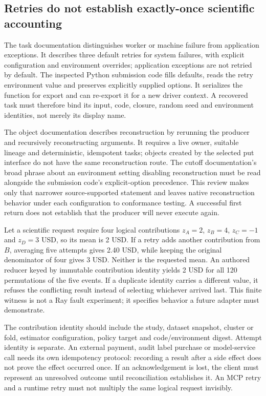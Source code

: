 \subsection{Retries do not establish exactly-once scientific accounting}
The task documentation distinguishes worker or machine failure from application exceptions. It describes three default retries for system failures, with explicit configuration and environment overrides; application exceptions are not retried by default. The inspected Python submission code fills defaults, reads the retry environment value and preserves explicitly supplied options. It serializes the function for export and can re-export it for a new driver context. A recovered task must therefore bind its input, code, closure, random seed and environment identities, not merely its display name.\citep{exec24_ray_sources}

The object documentation describes reconstruction by rerunning the producer and recursively reconstructing arguments. It requires a live owner, suitable lineage and deterministic, idempotent tasks; objects created by the selected put interface do not have the same reconstruction route. The cutoff documentation's broad phrase about an environment setting disabling reconstruction must be read alongside the submission code's explicit-option precedence. This review makes only that narrower source-supported statement and leaves native reconstruction behavior under each configuration to conformance testing. A successful first return does not establish that the producer will never execute again.\citep{exec24_ray_sources}

Let a scientific request require four logical contributions $z_A=2$, $z_B=4$, $z_C=-1$ and $z_D=3$ USD, so its mean is 2 USD. If a retry adds another contribution from $B$, averaging five attempts gives 2.40 USD, while keeping the original denominator of four gives 3 USD. Neither is the requested mean. An authored reducer keyed by immutable contribution identity yields 2 USD for all 120 permutations of the five events. If a duplicate identity carries a different value, it refuses the conflicting result instead of selecting whichever arrived last. This finite witness is not a Ray fault experiment; it specifies behavior a future adapter must demonstrate.\citep{exec24_ray_contract}

The contribution identity should include the study, dataset snapshot, cluster or fold, estimator configuration, policy target and code/environment digest. Attempt identity is separate. An external payment, audit label purchase or model-service call needs its own idempotency protocol: recording a result after a side effect does not prove the effect occurred once. If an acknowledgement is lost, the client must represent an unresolved outcome until reconciliation establishes it. An MCP retry and a runtime retry must not multiply the same logical request invisibly.

